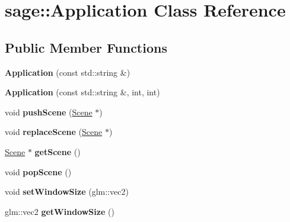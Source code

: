 \hypertarget{classsage_1_1Application}{}\section{sage\+::Application Class Reference}
\label{classsage_1_1Application}
\subsection*{Public Member Functions}
\begin{DoxyCompactItemize}
\item 
\mbox{\label{classsage_1_1Application_afecfc54e0f12cb5338c120b1c70a5390}} 
{\bfseries Application} (const std\+::string \&)
\item 
\mbox{\label{classsage_1_1Application_a70457853976a4b807b717970d9a8a830}} 
{\bfseries Application} (const std\+::string \&, int, int)
\item 
\mbox{\label{classsage_1_1Application_a13c5134f583987f36499c8bb60b7a1b9}} 
void {\bfseries push\+Scene} (\mbox{\hyperlink{classsage_1_1Scene}{Scene}} $\ast$)
\item 
\mbox{\label{classsage_1_1Application_a6b660417b9544456facc14103150352d}} 
void {\bfseries replace\+Scene} (\mbox{\hyperlink{classsage_1_1Scene}{Scene}} $\ast$)
\item 
\mbox{\label{classsage_1_1Application_a4eaac489d4247bd184e17fa0aa6c858c}} 
\mbox{\hyperlink{classsage_1_1Scene}{Scene}} $\ast$ {\bfseries get\+Scene} ()
\item 
\mbox{\label{classsage_1_1Application_a47b5bec61b3d93cbb4998b42d0d2ea47}} 
void {\bfseries pop\+Scene} ()
\item 
\mbox{\label{classsage_1_1Application_aa62d75376d65cf12d71bd681d8c0ecc1}} 
void {\bfseries set\+Window\+Size} (glm\+::vec2)
\item 
\mbox{\label{classsage_1_1Application_ac0fa1750ee8dcacc37cc9eaed72f12f9}} 
glm\+::vec2 {\bfseries get\+Window\+Size} ()

\end{DoxyCompactItemize}
